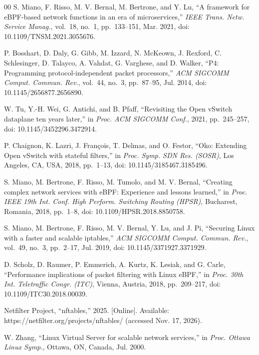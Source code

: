 \documentclass[conference]{IEEEtran}
\begin{document}
\begin{thebibliography}{00}
 S. Miano, F. Risso, M. V. Bernal, M. Bertrone, and
Y. Lu, ``A framework for eBPF-based network functions in an era of
microservices,'' \textit{IEEE Trans. Netw. Service Manag.}, vol.~18, no.~1,
pp.~133--151, Mar. 2021, doi: 10.1109/TNSM.2021.3055676.

 P. Bosshart, D. Daly, G. Gibb, M. Izzard,
N. McKeown, J. Rexford, C. Schlesinger, D. Talayco, A. Vahdat, G. Varghese,
and D. Walker, ``P4: Programming protocol-independent packet processors,''
\textit{ACM SIGCOMM Comput. Commun. Rev.}, vol.~44, no.~3, pp.~87--95,
Jul. 2014, doi: 10.1145/2656877.2656890.

 W. Tu, Y.-H. Wei, G. Antichi, and B. Pfaff, ``Revisiting
the Open vSwitch dataplane ten years later,'' in \textit{Proc. ACM SIGCOMM
Conf.}, 2021, pp.~245--257, doi: 10.1145/3452296.3472914.

 P. Chaignon, K. Lazri, J. Fran\c{c}ois, T. Delmas,
and O. Festor, ``Oko: Extending Open vSwitch with stateful filters,'' in
\textit{Proc. Symp. SDN Res. (SOSR)}, Los Angeles, CA, USA, 2018, pp.~1--13,
doi: 10.1145/3185467.3185496.

 S. Miano, M. Bertrone, F. Risso, M. Tumolo, and
M. V. Bernal, ``Creating complex network services with eBPF: Experience and
lessons learned,'' in \textit{Proc. IEEE 19th Int. Conf. High Perform.
Switching Routing (HPSR)}, Bucharest, Romania, 2018, pp.~1--8,
doi: 10.1109/HPSR.2018.8850758.

 S. Miano, M. Bertrone, F. Risso, M. V. Bernal,
Y. Lu, and J. Pi, ``Securing Linux with a faster and scalable iptables,''
\textit{ACM SIGCOMM Comput. Commun. Rev.}, vol.~49, no.~3, pp.~2--17,
Jul. 2019, doi: 10.1145/3371927.3371929.

 D. Scholz, D. Raumer, P. Emmerich, A. Kurtz,
K. Lesiak, and G. Carle, ``Performance implications of packet filtering with
Linux eBPF,'' in \textit{Proc. 30th Int. Teletraffic Congr. (ITC)}, Vienna,
Austria, 2018, pp.~209--217, doi: 10.1109/ITC30.2018.00039.

 Netfilter Project, ``nftables,'' 2025. [Online].
Available: https://netfilter.org/projects/nftables/ (accessed Nov. 17, 2026).

 W. Zhang, ``Linux Virtual Server for scalable network
services,'' in \textit{Proc. Ottawa Linux Symp.}, Ottawa, ON, Canada,
Jul. 2000.


\end{thebibliography}
\end{document}
